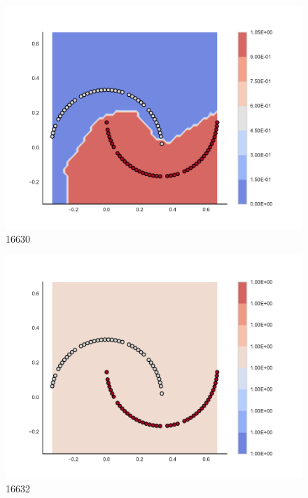 \begin{subfigure}[b]{0.09\textwidth}
    \includegraphics[clip, trim=2.35cm 1.75cm 4.5cm 0cm,width=\textwidth]{img/convergence/16630.pdf}
    \caption{16630}
    \label{fig:convergence_16630}
\end{subfigure}
%
\begin{subfigure}[b]{0.09\textwidth}
    \includegraphics[clip, trim=2.35cm 1.75cm 4.5cm 0cm,width=\textwidth]{img/convergence/16632.pdf}
    \caption{16632}
    \label{fig:convergence_16632}
\end{subfigure}
%
